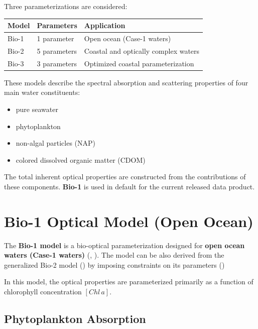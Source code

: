 \documentclass[
  11pt,
  letterpaper,
]{scrreprt}
\providecommand{\tightlist}{%
  \setlength{\itemsep}{0pt}\setlength{\parskip}{0pt}}
\begin{document}
Three parameterizations are considered:

\begin{longtable}[]{@{}lll@{}}
\toprule\noalign{}
Model & Parameters & Application \\
\midrule\noalign{}
\endhead
\bottomrule\noalign{}
\endlastfoot
Bio-1 & 1 parameter & Open ocean (Case-1 waters) \\
Bio-2 & 5 parameters & Coastal and optically complex waters \\
Bio-3 & 3 parameters & Optimized coastal parameterization \\
\end{longtable}

These models describe the spectral absorption and scattering properties
of four main water constituents:

\begin{itemize}
\tightlist
\item
  pure seawater
\item
  phytoplankton
\item
  non-algal particles (NAP)
\item
  colored dissolved organic matter (CDOM)
\end{itemize}

The total inherent optical properties are constructed from the
contributions of these components. \textbf{Bio-1} is used in default for
the current released data product.

\section{Bio-1 Optical Model (Open
Ocean)}\label{bio-1-optical-model-open-ocean}

The \textbf{Bio-1 model} is a bio-optical parameterization designed for
\textbf{open ocean waters (Case-1 waters)}
(,
). The model can be also derived from
the generalized Bio-2 model ()
by imposing constraints on its parameters ()

In this model, the optical properties are parameterized primarily as a
function of chlorophyll concentration \([Chl\,a]\).

\subsection{Phytoplankton Absorption}\label{phytoplankton-absorption}
\end{document}
